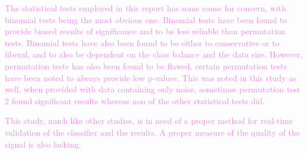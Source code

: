 \textcolor{violet}{The statistical tests employed in this report has some cause for concern, with binomial tests being the most obvious one. Binomial tests have been found to provide biased results of significance and to be less reliable than permutation tests\:\cite{noirhommeBiasedBinomialAssessment2014}. Binomial tests have also been found to be either to conservative or to liberal, and to also be dependent on the class balance and the data size\:\cite{ganzPermutationTestsClassification2017}. However, permutation tests has also been found to be flawed, certain permutation tests have been noted to always provide low p-values\:\cite{ojalaPermutationTestsStudying2009}. This was noted in this study as well, when provided with data containing only noise, sometimes permutation test $2$ found significant results whereas non of the other statistical tests did.}

\textcolor{violet}{This study, much like other studies, is in need of a proper method for real-time validation of the classifier and the results\:\cite{khoslaComparativeAnalysisSignal2020}.}
\textcolor{violet}{A proper measure of the quality of the signal is also lacking.}



\begin{comment}
discuss your BMI system and test case results with reference to other scientific work.

Here you can discuss your results, limitations and new questions that have arose while doing the work. Depending on the size of this report, you can present discussion and conclusion in one common section or in two separate ones.
\end{comment}
